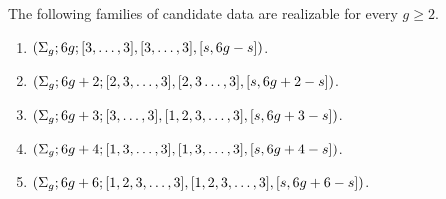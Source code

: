\begin{proposition}\label{dessins:th:special-families}
The following families of candidate data are realizable for every $g\ge 2$.
\begin{enumerate}[(1)]
\item $(\Sigma_{g};6g;[3,\ldots,3],[3,\ldots,3],[s,6g-s])$.
\item $(\Sigma_{g};6g+2;[2,3,\ldots,3],[2,3\ldots,3],[s,6g+2-s])$.
\item $(\Sigma_{g};6g+3;[3,\ldots,3],[1,2,3,\ldots,3],[s,6g+3-s])$.
\item $(\Sigma_{g};6g+4;[1,3,\ldots,3],[1,3,\ldots,3],[s,6g+4-s])$.
\item $(\Sigma_{g};6g+6;[1,2,3,\ldots,3],[1,2,3,\ldots,3],[s,6g+6-s])$.
\end{enumerate}
\end{proposition}

